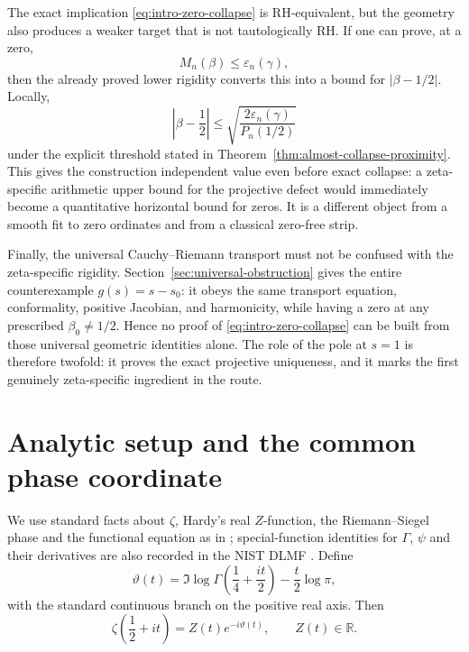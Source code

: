 \documentclass[11pt]{amsart}
\numberwithin{equation}{section}
\newcommand{\R}{\mathbb R}
\begin{document}
The exact implication \eqref{eq:intro-zero-collapse} is RH-equivalent, but the
geometry also produces a weaker target that is not tautologically RH.  If one
can prove, at a zero,
\begin{equation}
 M_n(\beta)\leq\varepsilon_n(\gamma),
 \label{eq:intro-upper-defect}
\end{equation}
then the already proved lower rigidity converts this into a bound for
$|\beta-1/2|$.  Locally,
\begin{equation}
 \left|\beta-\frac12\right|
 \leq
 \sqrt{\frac{2\varepsilon_n(\gamma)}{P_n(1/2)}}
 \label{eq:intro-proximity}
\end{equation}
under the explicit threshold stated in
Theorem~\ref{thm:almost-collapse-proximity}.  This gives the construction
independent value even before exact collapse: a zeta-specific arithmetic
upper bound for the projective defect would immediately become a quantitative
horizontal bound for zeros.  It is a different object from a smooth fit to
zero ordinates and from a classical zero-free strip.

Finally, the universal Cauchy--Riemann transport must not be confused with the
zeta-specific rigidity.  Section~\ref{sec:universal-obstruction} gives the
entire counterexample $g(s)=s-s_0$: it obeys the same transport equation,
conformality, positive Jacobian, and harmonicity, while having a zero at any
prescribed $\beta_0\neq1/2$.  Hence no proof of
\eqref{eq:intro-zero-collapse} can be built from those universal geometric
identities alone.  The role of the pole at $s=1$ is therefore twofold: it
proves the exact projective uniqueness, and it marks the first genuinely
zeta-specific ingredient in the route.

\section{Analytic setup and the common phase coordinate}
\label{sec:phase-setup}

We use standard facts about $\zeta$, Hardy's real $Z$-function, the
Riemann--Siegel phase and the functional equation as in
\cite{Titchmarsh1986,Ivic1985,Edwards1974}; special-function identities for
$\Gamma$, $\psi$ and their derivatives are also recorded in the NIST DLMF
\cite{DLMF}.  Define
\begin{equation}
 \vartheta(t)
 =\Im\log\Gamma\!\left(\frac14+\frac{it}{2}\right)
 -\frac t2\log\pi,
 \label{eq:theta-definition}
\end{equation}
with the standard continuous branch on the positive real axis.  Then
\begin{equation}
 \zeta\!\left(\frac12+it\right)
 =Z(t)e^{-i\vartheta(t)},
 \qquad
 Z(t)\in\R.
 \label{eq:hardy-representation}
\end{equation}
\end{document}
